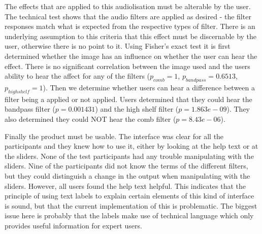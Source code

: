 The effects that are applied to this audiolisation must be alterable by the user. The technical test shows that the audio filters are applied as desired - the filter responses match what is expected from the respective types of filter. There is an underlying assumption to this criteria that this effect must be discernable by the user, otherwise there is no point to it. Using Fisher's exact test it is first determined whether the image has an influence on whether the user can hear the effect. There is no significant correlation between the image used and the users ability to hear the affect for any of the filters ($p_{comb}=1$, $p_{bandpass}=0.6513$, $p_{highshelf}=1$). Then we determine whether users can hear a difference between a filter being a applied or not applied. Users determined that they could hear the bandpass filter ($p=0.001431$) and the high shelf filter ($p=1.863e-09$). They also determined they could NOT hear the comb filter ($p=8.43e-06$).

Finally the product must be usable. The interface was clear for all the participants and they knew how to use it, either by looking at the help text or at the sliders. None of the test participants had any trouble manipulating with the sliders. Nine of the participants did not know the terms of the different filters, but they could distinguish a change in the output when manipulating with the sliders. However, all users found the help text helpful. This indicates that the principle of using text labels to explain certain elements of this kind of interface is sound, but that the current implementation of this is problematic. The biggest issue here is probably that the labels make use of technical language which only provides useful information for expert users.
 
